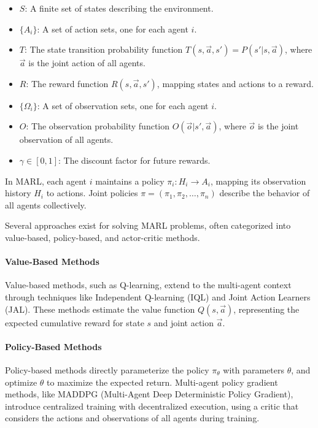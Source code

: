 \documentclass[conference]{IEEEtran}
\begin{document}
\begin{itemize}
    \item $S$: A finite set of states describing the environment.
    \item $\{A_i\}$: A set of action sets, one for each agent $i$.
    \item $T$: The state transition probability function $T(s, \vec{a}, s') = P(s'|s, \vec{a})$, where $\vec{a}$ is the joint action of all agents.
    \item $R$: The reward function $R(s, \vec{a}, s')$, mapping states and actions to a reward.
    \item $\{\Omega_i\}$: A set of observation sets, one for each agent $i$.
    \item $O$: The observation probability function $O(\vec{o} | s', \vec{a})$, where $\vec{o}$ is the joint observation of all agents.
    \item $\gamma \in [0,1]$: The discount factor for future rewards.
\end{itemize}

In MARL, each agent $i$ maintains a policy $\pi_i: H_i \rightarrow A_i$, mapping its observation history $H_i$ to actions. Joint policies $\pi = (\pi_1, \pi_2, \ldots, \pi_n)$ describe the behavior of all agents collectively.

Several approaches exist for solving MARL problems, often categorized into value-based, policy-based, and actor-critic methods.

\paragraph{Value-Based Methods}

Value-based methods, such as Q-learning, extend to the multi-agent context through techniques like Independent Q-learning (IQL) and Joint Action Learners (JAL). These methods estimate the value function $Q(s, \vec{a})$, representing the expected cumulative reward for state $s$ and joint action $\vec{a}$.

\paragraph{Policy-Based Methods}

Policy-based methods directly parameterize the policy $\pi_{\theta}$ with parameters $\theta$, and optimize $\theta$ to maximize the expected return. Multi-agent policy gradient methods, like MADDPG (Multi-Agent Deep Deterministic Policy Gradient), introduce centralized training with decentralized execution, using a critic that considers the actions and observations of all agents during training.
\end{document}

